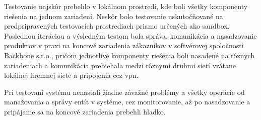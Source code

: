 Testovanie najskôr prebehlo v lokálnom prostredí, kde boli všetky komponenty riešenia na jednom zariadení. Neskôr bolo testovanie
uskutočňované na predpripravených testovacích prostrediach priamo určených ako sandbox.
Poslednou iteráciou a výsledným testom bola správa, komunikácia a nasadzovanie produktov v praxi na koncové zariadenia zákazníkov
v softvérovej spoločnosti Backbone s.r.o., pričom jednotlivé komponenty riešenia boli nasadené na rôznych zariadeniach a komunikácia
prebiehala medzi rôznymi druhmi sietí vrátane lokálnej firemnej siete a pripojenia cez vpn.

Pri testovaní systému nenastali žiadne závažné problémy a všetky operácie od manažovania a správy entít v systéme, cez
monitorovanie, až po nasadzovanie a pripájanie sa na koncové zariadenia prebehli hladko.
